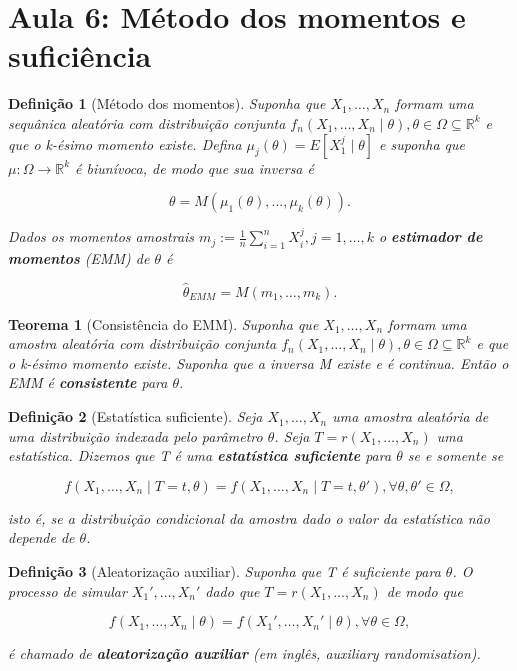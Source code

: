 \documentclass{article}
\newtheorem{theorem}{Teorema}
\newtheorem{definition}{Definição}
\begin{document}
\section*{Aula 6: Método dos momentos e suficiência}
\label{s6}
\begin{definition}[Método dos momentos]
Suponha que $X_1, \ldots, X_n$ formam uma sequânica aleatória com distribuição conjunta $f_n (X_1, \ldots, X_n \mid \theta), \theta \in \Omega \subseteq \mathbb{R}^k$ e que o k-ésimo momento existe. Defina $\mu_j (\theta) = E[X_1^j \mid \theta]$ e suponha que $\mu: \Omega \rightarrow \mathbb{R}^k$ é biunívoca, de modo que sua inversa é

$$\theta = M(\mu_1(\theta), \ldots, \mu_k(\theta)).$$

Dados os momentos amostrais $m_j := \frac{1}{n} \sum_{i=1}^n X_i^j, j = 1, \ldots, k$ o \textbf{estimador de momentos} (EMM) de $\theta$ é

$$\hat{\theta}_{EMM} = M(m_1, \ldots, m_k).$$
\end{definition}

\begin{theorem}[Consistência do EMM]
Suponha que $X_1, \ldots, X_n$ formam uma amostra aleatória com distribuição conjunta  $f_n (X_1, \ldots, X_n \mid \theta), \theta \in \Omega \subseteq \mathbb{R}^k$ e que o k-ésimo momento existe. Suponha que a inversa M existe e é continua. Então o EMM é \textbf{consistente} para $\theta$.
\end{theorem}

\begin{definition}[Estatística suficiente]
Seja $X_1, \ldots, X_n$ uma amostra aleatória de uma distribuição indexada pelo parâmetro $\theta$. Seja $T = r(X_1, \ldots, X_n)$ uma estatística. Dizemos que T é uma \textbf{estatística suficiente} para $\theta$ se e somente se

\begin{equation}
    f(X_1, \ldots, X_n \mid T = t, \theta) = f(X_1, \ldots, X_n \mid T = t, \theta'), \forall \theta, \theta' \in \Omega,
\end{equation}

isto é, se a distribuição condicional da amostra dado o valor da estatística não depende de $\theta$.
\end{definition}

\begin{definition}[Aleatorização auxiliar]
 Suponha que T é suficiente para $\theta$. O processo de simular $X_1', \ldots, X_n'$ dado que $T = r(X_1, \ldots, X_n)$ de modo que 
 
 \begin{equation}
     f(X_1, \ldots, X_n \mid \theta) = f(X_1', \ldots, X_n' \mid \theta), \forall \theta \in \Omega,
 \end{equation}
 
 é chamado de \textbf{aleatorização auxiliar} (em inglês, auxiliary randomisation).
\end{definition}
\end{document}
